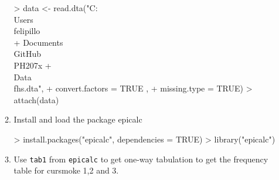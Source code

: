 \documentclass{article}
\begin{document}
\begin{enumerate}
\begin{enumerate}
\begin{Schunk}
\begin{Sinput}
> data <- read.dta("C:\\Users\\felipillo\\
+                  Documents\\GitHub\\PH207x
+                  \\Data\\fhs.dta",
+                  convert.factors = TRUE ,
+                  missing.type = TRUE)
> attach(data)
\end{Sinput}
\end{Schunk}
\item Install and load the package epicalc
\begin{Schunk}
\begin{Sinput}
> install.packages("epicalc", dependencies = TRUE)
> library("epicalc")
\end{Sinput}
\end{Schunk}
\item Use \texttt{tab1} from \texttt{epicalc} to get one-way tabulation to get the frequency table for cursmoke 1,2 and 3.\\


\end{enumerate}
\end{enumerate}
\end{document}
